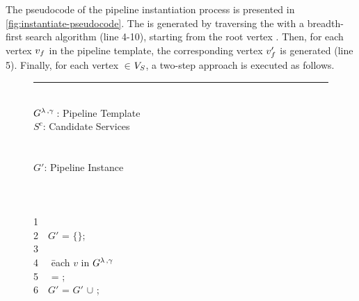 {\color{OurColor}The pseudocode of the pipeline instantiation process is presented in \cref{fig:instantiate-pseudocode}.} The \pipelineInstance  is generated by traversing the \pipelineTemplate with a breadth-first search algorithm {\color{OurColor}(line 4-10)}, starting from the root vertex .
Then, for each vertex $v_{f}$ in the pipeline template, the corresponding vertex $v'_{f}$ is generated {\color{OurColor}(line 5)}.
Finally, for each vertex $\in$$V_S$, a two-step approach is executed as follows.

\newenvironment{redtext}{\footnotesize	\color{gray}}{~~}
\newenvironment{ourcolor}{\color{OurColor}}{~~}
\begin{figure}[!t]

  \hrule\vspace{3pt}
  \begin{ourcolor}
  \begin{tabbing}
      \INPUT\\
      $G^{\lambda\,,\gamma\,}$: Pipeline Template\\
      $S^c$: Candidate Services\\
      ~\\[1pt]
      \OUTPUT\\
      $G'$: Pipeline Instance\\
      ~\\[1pt]
      \\
      \\
      \begin{redtext}1\end{redtext}\\
      \begin{redtext}2\end{redtext}$G'$ = $\{\}$;\\
      \begin{redtext}3\end{redtext}\\
      \begin{redtext}4\end{redtext} \= each $v$ in $G^{\lambda\,,\gamma\,}$\\
      \begin{redtext}5\end{redtext}\tabone \vii{} = ;\\
      \begin{redtext}6\end{redtext}\tabone $G'$ = $G'$ $\cup$ \vii;\\


\end{tabbing}
\end{ourcolor}
\end{figure}
